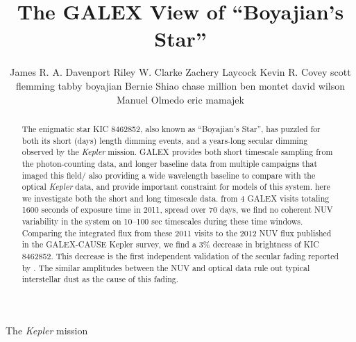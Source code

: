 \documentclass[manuscript, letterpaper]{aastex6}
\makeatletter
\let\origsection\section
\renewcommand\section{\@ifstar{\starsection}{\nostarsection}}
\newcommand\nostarsection[1]{\sectionprelude\origsection{#1}}
\newcommand\starsection[1]{\sectionprelude\origsection*{#1}}
\newcommand\sectionprelude{\vspace{1em}}
\newcommand{\Kepler}{\textsl{Kepler}\xspace}
\makeatother
\begin{document}
\title{The GALEX View of ``Boyajian's Star''}


\author{
	James R. A. Davenport
	Riley W. Clarke
	Zachery Laycock
	Kevin R. Covey
	scott flemming
	tabby boyajian
	Bernie Shiao
	chase million
	ben montet
	david wilson
	Manuel Olmedo
	eric mamajek
	}

 

 

\begin{abstract}
The enigmatic star KIC 8462852, also known as ``Boyajian's Star'',  has puzzled for both its short (days) length dimming events, and a years-long secular dimming observed by the \Kepler mission.
GALEX provides both short timescale sampling from the photon-counting data, and longer baseline data from multiple campaigns that imaged this field/ also providing a wide wavelength baseline to compare with the optical \Kepler data, and provide important constraint for models of this system.
here we investigate both the short and long timescale data. from 4 GALEX visits totaling 1600 seconds of exposure time in 2011, spread over 70 days, we find no coherent NUV variability in the system on 10--100 sec timescales during these time windows. Comparing the integrated flux from these 2011 visits to the 2012 NUV flux published in the GALEX-CAUSE Kepler survey, we find a 3\% decrease in brightness of KIC 8462852. This decrease is the first independent validation of the secular fading reported by \citet{montet2016}. The similar amplitudes between the NUV and optical data rule out typical interstellar dust as the cause of this fading.
\end{abstract}



\section{Introduction}

The \Kepler mission \citep{borucki2010} 
\end{document}
